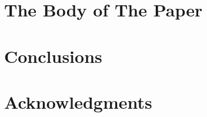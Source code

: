 \documentclass{acm_proc_article-sp}
\begin{document}
\section{The {\secit Body} of The Paper}


\section{Conclusions}


\section{Acknowledgments}


%

%
\end{document}
